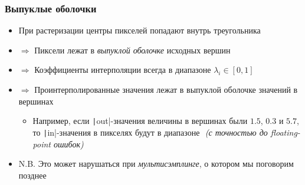 \documentclass[10pt]{beamer}
\begin{document}
\begin{frame}[fragile]
\frametitle{Выпуклые оболочки}
\begin{itemize}
\item При растеризации центры пикселей попадают внутрь треугольника
\pause
\item \begin{math}\Rightarrow\end{math} Пиксели лежат в \textit{выпуклой оболочке} исходных вершин
\pause
\item \begin{math}\Rightarrow\end{math} Коэффициенты интерполяции всегда в диапазоне \begin{math}\lambda_i \in [0, 1]\end{math}
\pause
\item \begin{math}\Rightarrow\end{math} Проинтерполированные значения лежат в выпуклой оболочке значений в вершинах
\begin{itemize}
\item Например, если \texttt|out|-значения величины в вершинах были \begin{math}1.5\end{math}, \begin{math}0.3\end{math} и \begin{math}5.7\end{math}, то \texttt|in|-значения в пикселях будут в диапазоне \begin{math}[0.3, 5.7]\end{math} \textit{(с точностью до floating-point ошибок)}
\end{itemize}
\pause
\item N.B. Это может нарушаться при \textit{мультисэмплинге}, о котором мы поговорим позднее
\end{itemize}
\end{frame}
\end{document}
